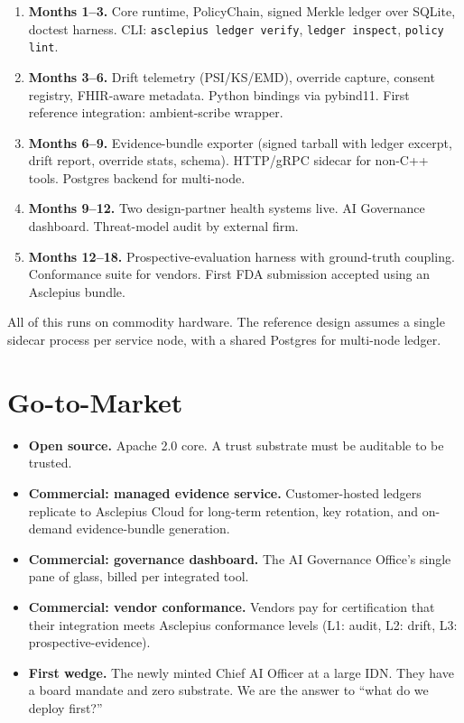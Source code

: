 \documentclass[11pt,a4paper]{article}
\begin{document}
\begin{enumerate}[leftmargin=1.4em]
  \item \textbf{Months 1--3.} Core runtime, PolicyChain, signed Merkle ledger over SQLite, doctest harness. CLI: \texttt{asclepius ledger verify}, \texttt{ledger inspect}, \texttt{policy lint}.
  \item \textbf{Months 3--6.} Drift telemetry (PSI/KS/EMD), override capture, consent registry, FHIR-aware metadata. Python bindings via pybind11. First reference integration: ambient-scribe wrapper.
  \item \textbf{Months 6--9.} Evidence-bundle exporter (signed tarball with ledger excerpt, drift report, override stats, schema). HTTP/gRPC sidecar for non-C++ tools. Postgres backend for multi-node.
  \item \textbf{Months 9--12.} Two design-partner health systems live. AI Governance dashboard. Threat-model audit by external firm.
  \item \textbf{Months 12--18.} Prospective-evaluation harness with ground-truth coupling. Conformance suite for vendors. First FDA submission accepted using an Asclepius bundle.
\end{enumerate}

All of this runs on commodity hardware. The reference design assumes a single sidecar process per service node, with a shared Postgres for multi-node ledger.

\section{Go-to-Market}

\begin{itemize}[leftmargin=1.2em]
  \item \textbf{Open source.} Apache 2.0 core. A trust substrate must be auditable to be trusted.
  \item \textbf{Commercial: managed evidence service.} Customer-hosted ledgers replicate to Asclepius Cloud for long-term retention, key rotation, and on-demand evidence-bundle generation.
  \item \textbf{Commercial: governance dashboard.} The AI Governance Office's single pane of glass, billed per integrated tool.
  \item \textbf{Commercial: vendor conformance.} Vendors pay for certification that their integration meets Asclepius conformance levels (L1: audit, L2: drift, L3: prospective-evidence).
  \item \textbf{First wedge.} The newly minted Chief AI Officer at a large IDN. They have a board mandate and zero substrate. We are the answer to ``what do we deploy first?''
\end{itemize}
\end{document}
